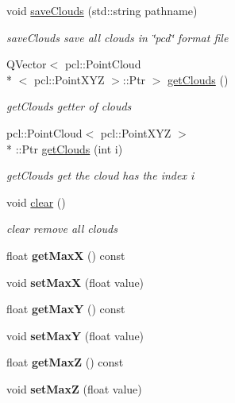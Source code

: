 \begin{DoxyCompactItemize}
void \hyperlink{classToolsPCL_a181bbd4a2e39bb12dd66b74dbc58425d}{save\-Clouds} (std\-::string pathname)
\begin{DoxyCompactList}\small\item\em save\-Clouds save all clouds in \char`\"{}pcd\char`\"{} format file \end{DoxyCompactList}\item 
Q\-Vector$<$ pcl\-::\-Point\-Cloud\\*
$<$ pcl\-::\-Point\-X\-Y\-Z $>$\-::Ptr $>$ \hyperlink{classToolsPCL_a1eb7da1d719387cb33f75827367ef9f4}{get\-Clouds} ()
\begin{DoxyCompactList}\small\item\em get\-Clouds getter of clouds \end{DoxyCompactList}\item 
pcl\-::\-Point\-Cloud$<$ pcl\-::\-Point\-X\-Y\-Z $>$\\*
\-::Ptr \hyperlink{classToolsPCL_a15e8d38bafcdcf59bbdeb0d8de5fc7d1}{get\-Clouds} (int i)
\begin{DoxyCompactList}\small\item\em get\-Clouds get the cloud has the index i \end{DoxyCompactList}\item 
\hypertarget{classToolsPCL_a4f0f28905620a7ee5f4b0e90980b0334}{void \hyperlink{classToolsPCL_a4f0f28905620a7ee5f4b0e90980b0334}{clear} ()}\label{classToolsPCL_a4f0f28905620a7ee5f4b0e90980b0334}

\begin{DoxyCompactList}\small\item\em clear remove all clouds \end{DoxyCompactList}\item 
\hypertarget{classToolsPCL_a90c5602b7c710f8712fe777e36fe90a8}{float {\bfseries get\-Max\-X} () const }\label{classToolsPCL_a90c5602b7c710f8712fe777e36fe90a8}

\item 
\hypertarget{classToolsPCL_a9f3bf7d917292cc3fca90e98efe57095}{void {\bfseries set\-Max\-X} (float value)}\label{classToolsPCL_a9f3bf7d917292cc3fca90e98efe57095}

\item 
\hypertarget{classToolsPCL_ae29f540eb43bf81e27a449be015b708b}{float {\bfseries get\-Max\-Y} () const }\label{classToolsPCL_ae29f540eb43bf81e27a449be015b708b}

\item 
\hypertarget{classToolsPCL_a4d1993759b3829340585b55d60f4acaf}{void {\bfseries set\-Max\-Y} (float value)}\label{classToolsPCL_a4d1993759b3829340585b55d60f4acaf}

\item 
\hypertarget{classToolsPCL_ac03e32ac82d4ba54d6adeeec55db39f1}{float {\bfseries get\-Max\-Z} () const }\label{classToolsPCL_ac03e32ac82d4ba54d6adeeec55db39f1}

\item 
\hypertarget{classToolsPCL_a1a55b6282fb5e4d6e92282a554422cd5}{void {\bfseries set\-Max\-Z} (float value)}\label{classToolsPCL_a1a55b6282fb5e4d6e92282a554422cd5}

\end{DoxyCompactItemize}
